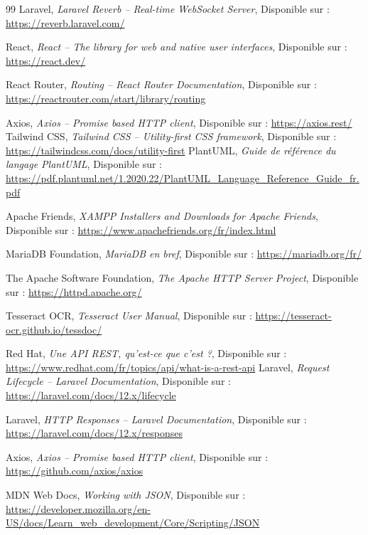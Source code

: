 \begin{thebibliography}{99}
Laravel,
\textit{Laravel Reverb -- Real-time WebSocket Server},
Disponible sur :
\url{https://reverb.laravel.com/}


React,
\textit{React -- The library for web and native user interfaces},
Disponible sur :
\url{https://react.dev/}

React Router,
\textit{Routing -- React Router Documentation},
Disponible sur :
\url{https://reactrouter.com/start/library/routing}

Axios,
\textit{Axios -- Promise based HTTP client},
Disponible sur :
\url{https://axios.rest/}
Tailwind CSS,
\textit{Tailwind CSS -- Utility-first CSS framework},
Disponible sur :
\url{https://tailwindcss.com/docs/utility-first}
PlantUML,
\textit{Guide de référence du langage PlantUML},
Disponible sur :
\url{https://pdf.plantuml.net/1.2020.22/PlantUML_Language_Reference_Guide_fr.pdf}

Apache Friends,
\textit{XAMPP Installers and Downloads for Apache Friends},
Disponible sur :
\url{https://www.apachefriends.org/fr/index.html}

MariaDB Foundation,
\textit{MariaDB en bref},
Disponible sur :
\url{https://mariadb.org/fr/}

The Apache Software Foundation,
\textit{The Apache HTTP Server Project},
Disponible sur :
\url{https://httpd.apache.org/}

Tesseract OCR,
\textit{Tesseract User Manual},
Disponible sur :
\url{https://tesseract-ocr.github.io/tessdoc/}

Red Hat,
\textit{Une API REST, qu'est-ce que c'est ?},
Disponible sur :
\url{https://www.redhat.com/fr/topics/api/what-is-a-rest-api}
Laravel,
\textit{Request Lifecycle -- Laravel Documentation},
Disponible sur :
\url{https://laravel.com/docs/12.x/lifecycle}

Laravel,
\textit{HTTP Responses -- Laravel Documentation},
Disponible sur :
\url{https://laravel.com/docs/12.x/responses}

Axios,
\textit{Axios -- Promise based HTTP client},
Disponible sur :
\url{https://github.com/axios/axios}

MDN Web Docs,
\textit{Working with JSON},
Disponible sur :
\url{https://developer.mozilla.org/en-US/docs/Learn_web_development/Core/Scripting/JSON}


\end{thebibliography}
